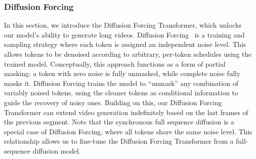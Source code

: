 \documentclass{article}
\begin{document}
{\subsubsection{Diffusion Forcing}
\label{subsec:diffusion_forcing}
In this section, we introduce the Diffusion Forcing Transformer, which unlocks our model’s ability to generate long videos. Diffusion Forcing~\cite{chen2024diffusionforcingnexttokenprediction} is a training and sampling strategy where each token is assigned an independent noise level. This allows tokens to be denoised according to arbitrary, per-token schedules using the trained model. Conceptually, this approach functions as a form of partial masking: a token with zero noise is fully unmasked, while complete noise fully masks it. Diffusion Forcing trains the model to “unmask” any combination of variably noised tokens, using the cleaner tokens as conditional information to guide the recovery of noisy ones. Building on this, our Diffusion Forcing Transformer can extend video generation indefinitely based on the last frames of the previous segment. 
Note that the synchronous full sequence diffusion is a special case of Diffusion Forcing, where all tokens share the same noise level. This relationship allows us to fine-tune the Diffusion Forcing Transformer from a full-sequence diffusion model.


}
\end{document}
